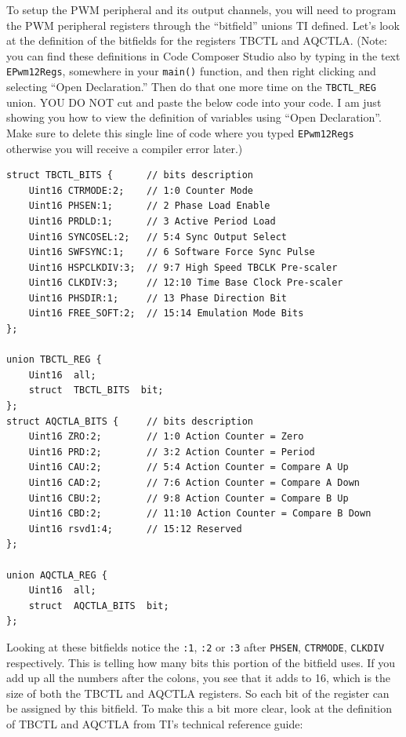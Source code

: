 \documentclass[11pt]{article}
\begin{document}
To setup the PWM peripheral and its output channels, you will need to program the PWM peripheral registers through the “bitfield” unions TI defined. Let’s look at the definition of the bitfields for the registers TBCTL and AQCTLA. (Note: you can find these definitions in Code Composer Studio also by typing in the text \texttt{EPwm12Regs}, somewhere in your \texttt{main()} function, and then right clicking and selecting “Open Declaration.” Then do that one more time on the \texttt{TBCTL_REG} union. YOU DO NOT cut and paste the below code into your code. I am just showing you how to view the definition of variables using “Open Declaration”. Make sure to delete this single line of code where you typed \texttt{EPwm12Regs} otherwise you will receive a compiler error later.)
%
\begin{verbatim}
struct TBCTL_BITS {      // bits description
    Uint16 CTRMODE:2;    // 1:0 Counter Mode
    Uint16 PHSEN:1;      // 2 Phase Load Enable
    Uint16 PRDLD:1;      // 3 Active Period Load
    Uint16 SYNCOSEL:2;   // 5:4 Sync Output Select
    Uint16 SWFSYNC:1;    // 6 Software Force Sync Pulse
    Uint16 HSPCLKDIV:3;  // 9:7 High Speed TBCLK Pre-scaler
    Uint16 CLKDIV:3;     // 12:10 Time Base Clock Pre-scaler
    Uint16 PHSDIR:1;     // 13 Phase Direction Bit
    Uint16 FREE_SOFT:2;  // 15:14 Emulation Mode Bits
};

union TBCTL_REG {
    Uint16  all;
    struct  TBCTL_BITS  bit;
};
struct AQCTLA_BITS {     // bits description
    Uint16 ZRO:2;        // 1:0 Action Counter = Zero
    Uint16 PRD:2;        // 3:2 Action Counter = Period
    Uint16 CAU:2;        // 5:4 Action Counter = Compare A Up
    Uint16 CAD:2;        // 7:6 Action Counter = Compare A Down
    Uint16 CBU:2;        // 9:8 Action Counter = Compare B Up
    Uint16 CBD:2;        // 11:10 Action Counter = Compare B Down
    Uint16 rsvd1:4;      // 15:12 Reserved
};

union AQCTLA_REG {
    Uint16  all;
    struct  AQCTLA_BITS  bit;
};
\end{verbatim}
%
Looking at these bitfields notice the \texttt{:1}, \texttt{:2} or \texttt{:3} after \texttt{PHSEN}, \texttt{CTRMODE}, \texttt{CLKDIV} respectively. This is telling how many bits this portion of the bitfield uses. If you add up all the numbers after the colons, you see that it adds to 16, which is the size of both the TBCTL and AQCTLA registers. So each bit of the register can be assigned by this bitfield. To make this a bit more clear, look at the definition of TBCTL and AQCTLA from TI’s technical reference guide:
\end{document}
